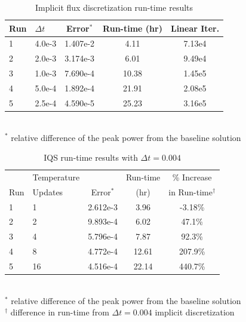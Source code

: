 \documentclass{elsarticle}
\begin{document}
\begin{table}[!htbp]
\begin{center}
\caption{Implicit flux discretization run-time results}
\label{tab:ndiff_lra}
\begin{tabular}{|l|l|ccc|}
\hline
Run  &  $\Delta t$ & Error$^*$ & Run-time (hr) & Linear Iter.\\
\hline
1	& 4.0e-3	& 1.407e-2 	& 4.11	& 7.13e4	\\
\rowcolor{yellow} 2	& 2.0e-3	& 3.174e-3 	& 6.01	& 9.49e4 	\\
3 	& 1.0e-3 	& 7.690e-4 	& 10.38	& 1.45e5	\\
4 	& 5.0e-4 	& 1.892e-4 	& 21.91	& 2.08e5	\\
5 	& 2.5e-4	& 4.590e-5 	& 25.23	& 3.16e5	\\
\hline
\end{tabular} \\
\footnotesize{$^*$ relative difference of the peak power from the baseline solution}
\end{center}
\end{table}

\begin{table}[!htbp]
\begin{center}
\caption{IQS run-time results with $\Delta t = 0.004$}
\label{tab:iqs_lra}
\begin{tabular}{|l|l|ccc|}
\hline
	&  Temperature 	&  		& Run-time 	& \% Increase	\\
Run	&  Updates 	& Error$^*$ & (hr)		& in Run-time$^{\dagger}$\\
\hline
\rowcolor{yellow} 1	& 1		& 2.612e-3 	& 3.96 	& -3.18\%	\\
2	& 2		& 9.893e-4 	& 6.02	&  47.1\%	\\
3 	& 4 	& 5.796e-4 	& 7.87	&  92.3\%	\\
4 	& 8 	& 4.772e-4 	& 12.61	& 207.9\% 	\\
5 	& 16	& 4.516e-4 	& 22.14	& 440.7\%	\\
\hline
\end{tabular}
\\
\footnotesize{$^*$ relative difference of the peak power from the baseline solution}\\
\footnotesize{$^{\dagger}$ difference in run-time from $\Delta t = 0.004$ implicit discretization} 
\end{center}
\end{table}
\end{document}
